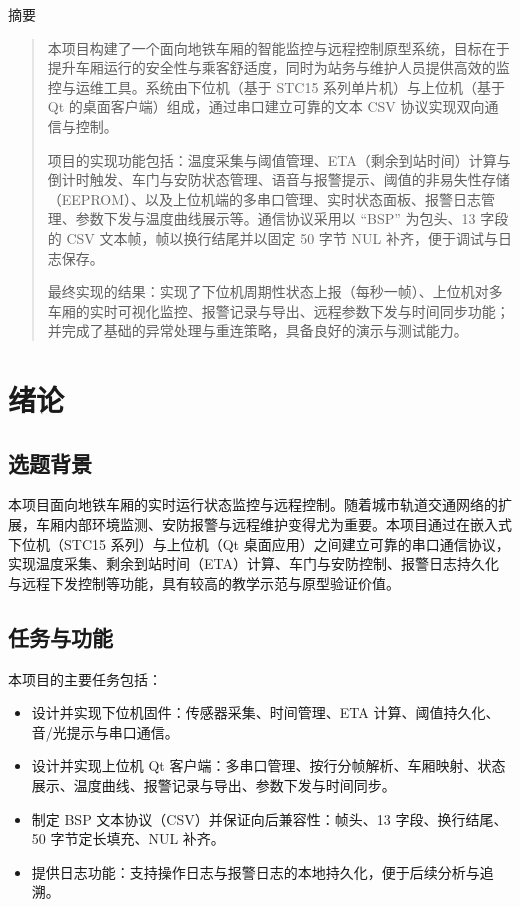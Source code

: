 \documentclass[12pt]{article}
\begin{document}
\begin{center}
	{\LARGE 摘要}
\end{center}
\vspace{-0.5em}
\begin{quote}
\small
本项目构建了一个面向地铁车厢的智能监控与远程控制原型系统，目标在于提升车厢运行的安全性与乘客舒适度，同时为站务与维护人员提供高效的监控与运维工具。系统由下位机（基于 STC15 系列单片机）与上位机（基于 Qt 的桌面客户端）组成，通过串口建立可靠的文本 CSV 协议实现双向通信与控制。

项目的实现功能包括：温度采集与阈值管理、ETA（剩余到站时间）计算与倒计时触发、车门与安防状态管理、语音与报警提示、阈值的非易失性存储（EEPROM）、以及上位机端的多串口管理、实时状态面板、报警日志管理、参数下发与温度曲线展示等。通信协议采用以 ``BSP'' 为包头、13 字段的 CSV 文本帧，帧以换行结尾并以固定 50 字节 NUL 补齐，便于调试与日志保存。

最终实现的结果：实现了下位机周期性状态上报（每秒一帧）、上位机对多车厢的实时可视化监控、报警记录与导出、远程参数下发与时间同步功能；并完成了基础的异常处理与重连策略，具备良好的演示与测试能力。
\end{quote}
\vspace{0.5em}
\newpage

\tableofcontents
\newpage
\section{绪论}
\subsection{选题背景}
本项目面向地铁车厢的实时运行状态监控与远程控制。随着城市轨道交通网络的扩展，车厢内部环境监测、安防报警与远程维护变得尤为重要。本项目通过在嵌入式下位机（STC15 系列）与上位机（Qt 桌面应用）之间建立可靠的串口通信协议，实现温度采集、剩余到站时间（ETA）计算、车门与安防控制、报警日志持久化与远程下发控制等功能，具有较高的教学示范与原型验证价值。
\subsection{任务与功能}
本项目的主要任务包括：\begin{itemize}
\item 设计并实现下位机固件：传感器采集、时间管理、ETA 计算、阈值持久化、音/光提示与串口通信。
\item 设计并实现上位机 Qt 客户端：多串口管理、按行分帧解析、车厢映射、状态展示、温度曲线、报警记录与导出、参数下发与时间同步。
\item 制定 BSP 文本协议（CSV）并保证向后兼容性：帧头、13 字段、换行结尾、50 字节定长填充、NUL 补齐。
\item 提供日志功能：支持操作日志与报警日志的本地持久化，便于后续分析与追溯。
\end{itemize}
\end{document}
